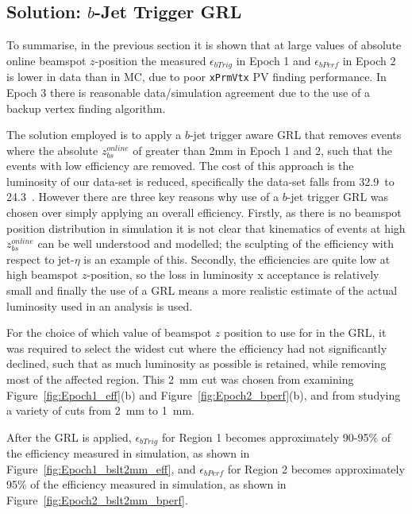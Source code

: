 \FloatBarrier

\subsection{Solution: $b$-Jet Trigger GRL}
\label{sec:trig-inv}

To summarise, in the previous section it is shown that at large values of absolute online beamspot $z$-position
the measured $\epsilon_{bTrig}$ in Epoch 1 and $\epsilon_{bPerf}$ in Epoch 2 is lower in data than in MC, due to poor \verb|xPrmVtx| PV finding performance.
In Epoch 3 there is reasonable data/simulation agreement due to the use of a backup vertex finding algorithm. 

The solution employed is to apply a $b$-jet trigger aware GRL 
that removes events where the  absolute  $z_{bs}^{online}$ of greater than 2mm in Epoch 1 and 2,
such that the events with low efficiency are removed.
The cost of this approach is the luminosity of our data-set is reduced, specifically the data-set falls from  32.9~\ifb to 24.3~\ifb.
However there are three key reasons why use of a $b$-jet trigger GRL was chosen over simply applying an overall efficiency.
Firstly, as there is no beamspot position distribution in simulation it is not clear that kinematics of events at high  $z_{bs}^{online}$ can be well understood and modelled;
the sculpting of the efficiency with respect to jet-$\eta$ is an example of this.
Secondly, the efficiencies are quite low at high beamspot $z$-position,
so the loss in luminosity x acceptance is relatively small
and finally the use of a GRL means a more realistic estimate of the actual luminosity used in an analysis is used. 

For the choice of which value of beamspot $z$ position to use for in the GRL,
it was required to select the widest cut where the efficiency had not significantly declined,
such that as much luminosity as possible is retained, while removing most of the affected region.
This \SI{2}{\mm} cut was chosen from examining Figure~\ref{fig:Epoch1_eff}(b) and Figure~\ref{fig:Epoch2_bperf}(b),
and from studying a variety of cuts from \SI{2}{\mm} to \SI{1}{\mm}.

After the GRL is applied, $\epsilon_{bTrig}$ for Region 1 becomes approximately 90-95\% of the efficiency measured in simulation,
as shown in Figure~\ref{fig:Epoch1_bslt2mm_eff},
and $\epsilon_{bPerf}$ for Region 2 becomes approximately 95\% of the efficiency measured in simulation,
as shown in Figure~\ref{fig:Epoch2_bslt2mm_bperf}. 

